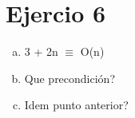 \documentclass{article}
\begin{document}
\section*{Ejercio 6}

\begin{enumerate}[a)]
    \item 3 + 2n $\equiv$ O(n)
    \item Que precondición?
    \item Idem punto anterior?
\end{enumerate}
\end{document}
